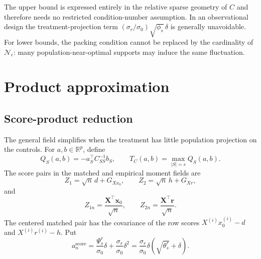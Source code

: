 \documentclass[a4paper,11pt,english]{article}
\newcommand{\R}{\mathbb R}
\begin{document}
The upper bound is expressed entirely in the relative sparse geometry of
$C$ and therefore needs no restricted condition-number assumption.  In
an observational design the treatment-projection term
$(\sigma_r/\sigma_0)\sqrt{\phi_s}\,\delta$ is generally unavoidable.
For lower bounds, the packing condition cannot be replaced by the
cardinality of $\mathcal N_\epsilon$: many population-near-optimal
supports may induce the same fluctuation.

\section{Product approximation}

\subsection{Score-product reduction}

The general field simplifies when the treatment has little population
projection on the controls.  For $a,b\in\R^p$, define
\begin{equation}\label{eq:chaos-functional}
        Q_S(a,b)=-a_S^\top C_{SS}^{-1}b_S,
        \qquad
        T_C(a,b)=\max_{|S|=s}Q_S(a,b).
\end{equation}
The score pairs in the matched and empirical moment fields are
\begin{equation}\label{eq:matched-scores}
        Z_1=\sqrt n\,d+G_{Xx_0},
        \qquad
        Z_2=\sqrt n\,h+G_{Xr},
\end{equation}
and
\begin{equation}\label{eq:empirical-scores}
        Z_{1n}=\frac{\mathbf X^\top\mathbf x_0}{\sqrt n},
        \qquad
        Z_{2n}=\frac{\mathbf X^\top\mathbf r}{\sqrt n}.
\end{equation}
The centered matched pair has the covariance of the row scores
$X^{(i)}x_0^{(i)}-d$ and $X^{(i)}r^{(i)}-h$.  Put
\begin{equation}\label{eq:local-treatment-scale}
        a_n^{\mathrm{score}}
        =\frac{\Psi_s^r}{\sigma_0}\delta
        +\frac{\sigma_r}{\sigma_0}\delta^2
        =\frac{\sigma_r}{\sigma_0}\delta
        (\sqrt{\theta_s^r}+\delta).
\end{equation}
\end{document}
